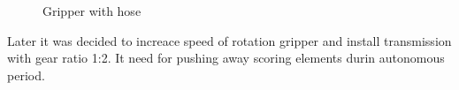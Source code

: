 	\begin{figure}[H]
		\begin{minipage}[h]{\linewidth}
			\caption{Gripper with hose}
		\end{minipage}
	\end{figure}
	Later it was decided to increace speed of rotation gripper and install transmission with gear ratio 1:2. It need for pushing away scoring elements durin autonomous period.
	
\fillpage	